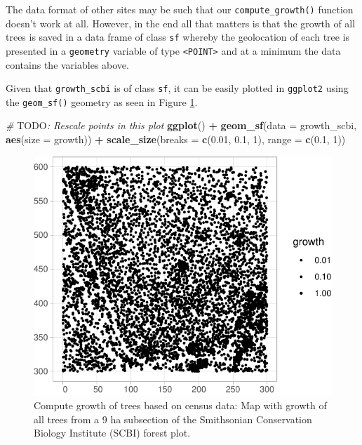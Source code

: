 \documentclass[12pt]{article}
\newenvironment{Shaded}{\begin{snugshade}}{\end{snugshade}}
\newcommand{\AlertTok}[1]{\textcolor[rgb]{0.94,0.16,0.16}{#1}}
\newcommand{\CommentTok}[1]{\textcolor[rgb]{0.56,0.35,0.01}{\textit{#1}}}
\newcommand{\DataTypeTok}[1]{\textcolor[rgb]{0.13,0.29,0.53}{#1}}
\newcommand{\DecValTok}[1]{\textcolor[rgb]{0.00,0.00,0.81}{#1}}
\newcommand{\FloatTok}[1]{\textcolor[rgb]{0.00,0.00,0.81}{#1}}
\newcommand{\KeywordTok}[1]{\textcolor[rgb]{0.13,0.29,0.53}{\textbf{#1}}}
\newcommand{\NormalTok}[1]{#1}
\newcommand{\OperatorTok}[1]{\textcolor[rgb]{0.81,0.36,0.00}{\textbf{#1}}}
\newcommand{\StringTok}[1]{\textcolor[rgb]{0.31,0.60,0.02}{#1}}
\begin{document}
The data format of other sites may be such that our
\texttt{compute\_growth()} function doesn't work at all. However, in the
end all that matters is that the growth of all trees is saved in a data
frame of class \texttt{sf} whereby the geolocation of each tree is
presented in a \texttt{geometry} variable of type
\texttt{\textless{}POINT\textgreater{}} and at a minimum the data
contains the variables above.

Given that \texttt{growth\_scbi} is of class \texttt{sf}, it can be
easily plotted in \texttt{ggplot2} using the \texttt{geom\_sf()}
geometry as seen in Figure \ref{fig:scbi-trees}.

\begin{Shaded}
\begin{Highlighting}[]
\CommentTok{# }\AlertTok{TODO}\CommentTok{: Rescale points in this plot}
\KeywordTok{ggplot}\NormalTok{() }\OperatorTok{+}
\StringTok{  }\KeywordTok{geom_sf}\NormalTok{(}\DataTypeTok{data =}\NormalTok{ growth_scbi, }\KeywordTok{aes}\NormalTok{(}\DataTypeTok{size =}\NormalTok{ growth)) }\OperatorTok{+}\StringTok{ }
\StringTok{  }\KeywordTok{scale_size}\NormalTok{(}\DataTypeTok{breaks =} \KeywordTok{c}\NormalTok{(}\FloatTok{0.01}\NormalTok{, }\FloatTok{0.1}\NormalTok{, }\DecValTok{1}\NormalTok{), }\DataTypeTok{range =} \KeywordTok{c}\NormalTok{(}\FloatTok{0.1}\NormalTok{, }\DecValTok{1}\NormalTok{))}
\end{Highlighting}
\end{Shaded}

\begin{figure}

{\centering \includegraphics[width=0.66\linewidth]{Figures/scbi-trees-1} 

}

\caption{Compute growth of trees based on census data: Map with growth of all trees from a 9 ha subsection of the Smithsonian Conservation Biology Institute (SCBI) forest plot.}\label{fig:scbi-trees}
\end{figure}
\end{document}
